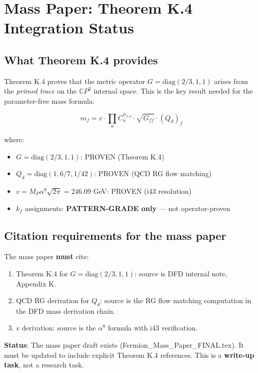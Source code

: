 \documentclass[11pt,a4paper]{article}
\newcommand{\CP}{\mathbb{C}P}
\begin{document}
\section{Mass Paper: Theorem K.4 Integration Status}

\subsection{What Theorem K.4 provides}

Theorem K.4 proves that the metric operator $G = \text{diag}(2/3, 1, 1)$ arises from the \emph{primed trace} on the $\CP^2$ internal space. This is the key result needed for the parameter-free mass formula:

\begin{equation}
m_f = v \cdot \prod_{a} C_a^{n_{f,a}} \cdot \sqrt{G_{ff}} \cdot (Q_d)_f
\end{equation}

where:
\begin{itemize}
\item $G = \text{diag}(2/3, 1, 1)$: PROVEN (Theorem K.4)
\item $Q_d = \text{diag}(1, 6/7, 1/42)$: PROVEN (QCD RG flow matching)
\item $v = M_P \alpha^8 \sqrt{2\pi} = 246.09$ GeV: PROVEN (i43 resolution)
\item $k_f$ assignments: \textbf{PATTERN-GRADE only} --- not operator-proven
\end{itemize}

\subsection{Citation requirements for the mass paper}

The mass paper \textbf{must} cite:
\begin{enumerate}
\item Theorem K.4 for $G = \text{diag}(2/3, 1, 1)$: source is DFD internal note, Appendix K.
\item QCD RG derivation for $Q_d$: source is the RG flow matching computation in the DFD mass derivation chain.
\item $v$ derivation: source is the $\alpha^8$ formula with i43 verification.
\end{enumerate}

\textbf{Status}: The mass paper draft exists (Fermion\_Mass\_Paper\_FINAL.tex). It must be updated to include explicit Theorem K.4 references. This is a \textbf{write-up task}, not a research task.
\end{document}
